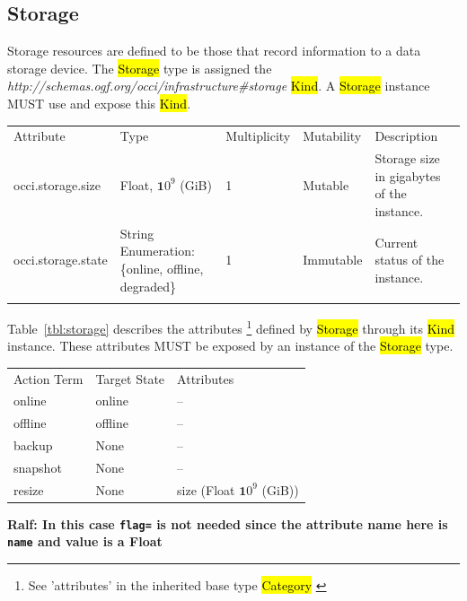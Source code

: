 \documentclass[10pt,a4paper]{article}
\begin{document}
\subsection{Storage}
Storage resources are defined to be those that record information to a data storage device. 
The \hl{Storage} type is assigned the \textit{http://schemas.ogf.org/occi/infrastructure\#storage} 
\hl{Kind}. A \hl{Storage} instance MUST use and expose this \hl{Kind}.

{
	\begin{tabular}{lp{2.5cm}p{1cm}lp{6cm}}
	\toprule
	Attribute&Type&Multi\-plicity&Mutability&Description\\
	\colrule
	\hline
	occi.storage.size & Float, ${\mathbf 10}^9$ (GiB) & 1 & Mutable 
	& Storage size in gigabytes of the 	instance.\\
	occi.storage.state & String Enumeration: \{online, offline, degraded\} & 1 & Immutable 
	& Current status of the instance.\\
	\botrule
	\end{tabular}
}
Table~\ref{tbl:storage} describes the attributes \footnote{See ’attributes’ in the inherited 
base type \hl{Category}  \cite{occi:core}} 
defined by \hl{Storage} through its \hl{Kind} instance. These attributes
MUST be exposed by an instance of the \hl{Storage} type.

{
	\begin{tabular}{lll}
	\toprule
	Action Term&Target State&Attributes\\
	\colrule
	online & online & --\\
	offline & offline & --\\
	backup & None & --\\
	snapshot & None & --\\
	resize & None & size (Float  ${\mathbf 10}^9$ (GiB))
	\end{tabular}
}
{\bf Ralf: In this case {\tt flag=} is not needed since the attribute name here is {\tt name} and value is a Float}
\end{document}
